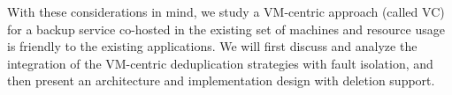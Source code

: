 With these considerations in mind, we study a 
VM-centric approach (called VC)
for a backup service co-hosted   in the existing set of machines and resource usage is friendly
to the existing applications.  
We will first discuss and analyze the integration of the VM-centric deduplication strategies with fault isolation, and then present
an architecture and implementation design with deletion support.

%





